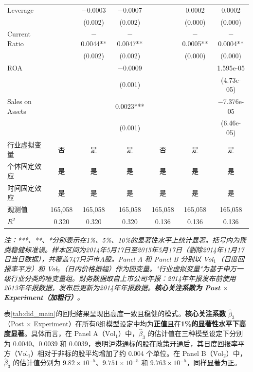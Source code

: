 \documentclass{article}
\begin{document}
\begin{table}[htbp]
{\begin{minipage}{1.2\textwidth}
\begin{tabular}{lcccccc}
            Leverage & & $-$0.0003 & $-$0.0007 & & 0.0002 & 0.0002 \\
            & & (0.002) & (0.002) & & (0.000) & (0.000) \\[0.3em]
            Current Ratio & & $-$0.0044** & $-$0.0047** & & $-$0.0005** & $-$0.0004** \\
            & & (0.002) & (0.002) & & (0.000) & (0.000) \\[0.3em]
            ROA & & & $-$0.0009 & & & 1.595e-05 \\
            & & & (0.001) & & & (4.73e-05) \\[0.3em]
            Sales on Assets & & & 0.0023*** & & & $-$7.376e-05 \\
            & & & (0.001) & & & (6.46e-05) \\[0.3em]
            \midrule
            行业虚拟变量 & 否 & 是 & 是 & 否 & 是 & 是 \\
            个体固定效应 & 是 & 是 & 是 & 是 & 是 & 是 \\
            时间固定效应 & 是 & 是 & 是 & 是 & 是 & 是 \\
            \midrule
            观测值 & 165,058 & 165,058 & 165,058 & 165,058 & 165,058 & 165,058 \\
            $R^2$ & 0.320 & 0.320 & 0.320 & 0.136 & 0.136 & 0.136 \\
            \bottomrule
        \end{tabular}
        \vspace{0.5em}
        \begin{minipage}{0.95\textwidth}
            \footnotesize\textit{注：***、**、*分别表示在1\%、5\%、10\%的显著性水平上统计显著。括号内为聚类稳健标准误。样本区间为2014年5月17日至2015年5月17日（剔除2014年11月17日当日数据），共覆盖747只沪市A股。Panel A 和 Panel B 分别以 $\emph{Vol}_1$（日度回报率平方）和 $\emph{Vol}_2$（日内价格振幅）作为因变量。"行业虚拟变量"为基于申万一级行业分类的哑变量组。财务数据取自上市公司年报：2014年年报发布前使用2013年年报数据，发布后更新为2014年年报数据。\textbf{核心关注系数为 Post $\times$ Experiment（加粗行）}。}
        \end{minipage}
    \end{minipage}%
    }
\end{table}

表\ref{tab:did_main}的回归结果呈现出高度一致且稳健的模式。\textbf{核心关注系数} $\hat{\beta}_3$（Post $\times$ Experiment）在所有6组模型设定中均为\textbf{正值}且在\textbf{1\%的显著性水平下高度显著}。具体而言，在 Panel A（$\text{Vol}_1$）中，$\hat{\beta}_3$ 的估计值在三种模型设定下分别为 0.0040、0.0039 和 0.0039，表明沪港通标的股在政策开通后，其日度回报率平方（$\text{Vol}_1$）相对于非标的股平均增加了约 0.004 个单位。在 Panel B（$\text{Vol}_2$）中，$\hat{\beta}_3$ 的估计值分别为 $9.82 \times 10^{-5}$、$9.751 \times 10^{-5}$ 和 $9.763 \times 10^{-5}$，同样显著为正。
\end{document}
